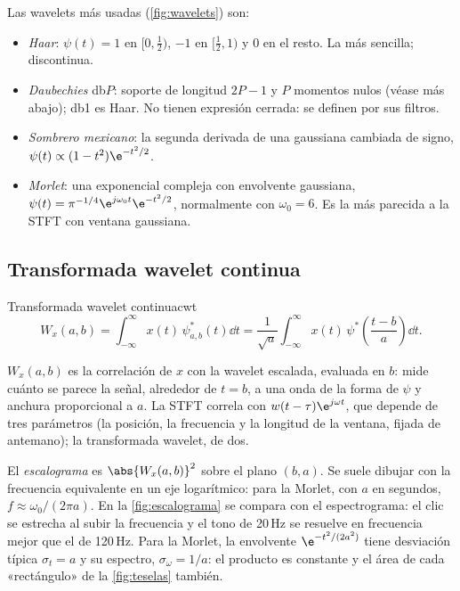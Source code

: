 \documentclass[11pt,a4paper]{scrartcl}
\begin{document}
Las wavelets más usadas (\cref{fig:wavelets}) son:
\begin{itemize}
  \item \emph{Haar}: $\psi(t)=1$ en $[0,\frac12)$, $-1$ en $[\frac12,1)$ y 0 en el resto. La más sencilla; discontinua.
  \item \emph{Daubechies} db$P$: soporte de longitud $2P-1$ y $P$ momentos nulos (véase más abajo); db1 es Haar. No tienen expresión cerrada: se definen por sus filtros.
  \item \emph{Sombrero mexicano}: la segunda derivada de una gaussiana cambiada de signo, $\psi(t)\propto(1-t^2)\e^{-t^2/2}$.
  \item \emph{Morlet}: una exponencial compleja con envolvente gaussiana, $\psi(t)=\pi^{-1/4}\e^{j\omega_0t}\e^{-t^2/2}$, normalmente con $\omega_0=6$. Es la más parecida a la STFT con ventana gaussiana.
\end{itemize}

\subsection{Transformada wavelet continua}

\begin{definicion}{Transformada wavelet continua}{cwt}
  \[
    W_x(a,b)=\int_{-\infty}^{\infty}x(t)\,\psi_{a,b}^*(t)\dd t=\frac1{\sqrt a}\int_{-\infty}^{\infty}x(t)\,\psi^*\!\left(\frac{t-b}a\right)\dd t .
  \]
\end{definicion}

$W_x(a,b)$ es la correlación de $x$ con la wavelet escalada, evaluada en $b$: mide cuánto se parece la señal, alrededor de $t=b$, a una onda de la forma de $\psi$ y anchura proporcional a $a$. La STFT correla con $w(t-\tau)\e^{j\omega t}$, que depende de tres parámetros (la posición, la frecuencia y la longitud de la ventana, fijada de antemano); la transformada wavelet, de dos.

El \emph{escalograma} es $\abs{W_x(a,b)}^2$ sobre el plano $(b,a)$. Se suele dibujar con la frecuencia equivalente en un eje logarítmico: para la Morlet, con $a$ en segundos, $f\approx\omega_0/(2\pi a)$. En la \cref{fig:escalograma} se compara con el espectrograma: el clic se estrecha al subir la frecuencia y el tono de 20\,Hz se resuelve en frecuencia mejor que el de 120\,Hz. Para la Morlet, la envolvente $\e^{-t^2/(2a^2)}$ tiene desviación típica $\sigma_t=a$ y su espectro, $\sigma_\omega=1/a$: el producto es constante y el área de cada «rectángulo» de la \cref{fig:teselas} también.
\end{document}
